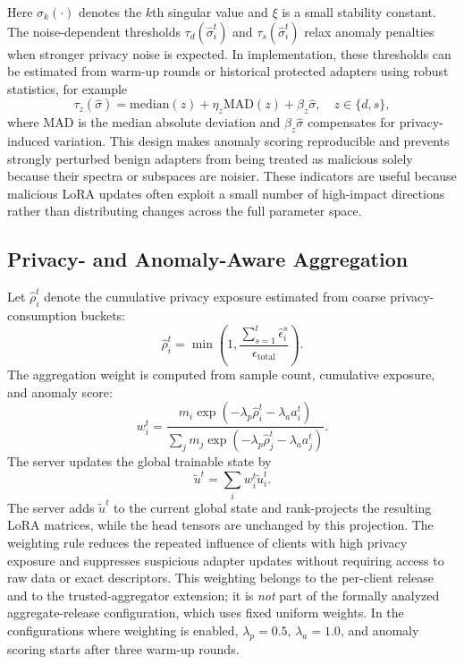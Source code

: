 \documentclass[a4paper,fleqn]{cas-dc}
\begin{document}
Here $\sigma_k(\cdot)$ denotes the $k$th singular value and $\xi$ is a small
stability constant. The noise-dependent thresholds $\tau_d(\hat{\sigma}_i^t)$
and $\tau_s(\hat{\sigma}_i^t)$ relax anomaly penalties when stronger privacy
noise is expected. In implementation, these thresholds can be estimated from
warm-up rounds or historical protected adapters using robust statistics, for
example
\begin{equation}
\tau_z(\hat{\sigma})=
\mathrm{median}(z)+\eta_z\mathrm{MAD}(z)+\beta_z\hat{\sigma},
\quad z\in\{d,s\},
\end{equation}
where $\mathrm{MAD}$ is the median absolute deviation and $\beta_z\hat{\sigma}$
compensates for privacy-induced variation. This design makes anomaly scoring
reproducible and prevents strongly perturbed benign adapters from being
treated as malicious solely because their spectra or subspaces are noisier.
These indicators are useful because malicious LoRA updates often exploit a
small number of high-impact directions rather than distributing changes
across the full parameter space.
\subsection{Privacy- and Anomaly-Aware Aggregation}
\label{subsec:anomaly-aggregation}
Let $\hat{\rho}_i^t$ denote the cumulative privacy exposure estimated from
coarse privacy-consumption buckets:
\begin{equation}
\hat{\rho}_i^t=
\min\left(1,\frac{\sum_{s=1}^t\hat{\epsilon}_i^s}{\epsilon_{\mathrm{total}}}\right).
\end{equation}
The aggregation weight is computed from sample count, cumulative exposure,
and anomaly score:
\begin{equation}
w_i^t =
\frac{
m_i\exp(-\lambda_p\hat{\rho}_i^t-\lambda_a a_i^t)
}{
\sum_j m_j\exp(-\lambda_p\hat{\rho}_j^t-\lambda_a a_j^t)
}.
\end{equation}
The server updates the global trainable state by
\begin{equation}
\widetilde{u}^{t}=\sum_i w_i^t\widetilde{u}_i^t .
\end{equation}
The server adds $\widetilde{u}^{t}$ to the current global state and
rank-projects the resulting LoRA matrices, while the head tensors are
unchanged by this projection. The weighting rule reduces the repeated
influence of clients with high privacy exposure and suppresses suspicious
adapter updates without requiring access to raw data or exact descriptors.
This weighting belongs to the per-client release and to the trusted-aggregator
extension; it is \emph{not} part of the formally analyzed aggregate-release
configuration, which uses fixed uniform weights. In the configurations where
weighting is enabled, $\lambda_p=0.5$, $\lambda_a=1.0$, and anomaly scoring
starts after three warm-up rounds.
\end{document}
